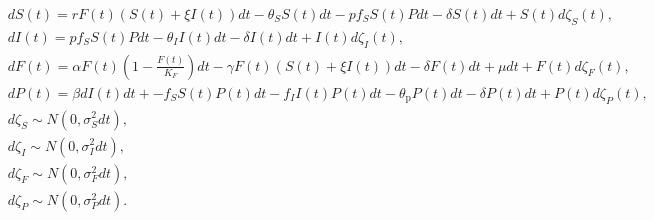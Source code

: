 \documentclass[12pt]{article}
\begin{document}
{
\small
\begin{align}
&d S(t) = r F(t)\left(S(t)+\xi I(t)\right)dt - \theta_{S}S(t) dt - p f_{S} S(t) Pdt - \delta S(t)dt + S(t) d\zeta_{S}(t),\\
&d I(t) = p f_{S} S(t) Pdt - \theta_{I} I(t)dt - \delta I(t)dt + I(t) d\zeta_{I}(t),\\
&dF(t) = \alpha F(t)\left(1-\frac{F(t)}{K_F}\right)dt - \gamma F(t) \left(S(t)+\xi I(t)\right) dt - \delta F(t) dt + \mu dt + F(t) d\zeta_F(t),\\
&d P(t) = \beta d I(t)dt +  - f_{S} S(t) P(t)dt - f_{I} I(t) P(t)dt - \theta_{\mathrm{p}} P(t)dt - \delta P(t) dt + P(t) d\zeta_{P}(t),\\
&d\zeta_{S} \sim N\left(0, \sigma_{S}^{2}dt\right),\\
&d\zeta_{I} \sim N\left(0, \sigma_{I}^{2}dt\right),\\
&d\zeta_{F} \sim N\left(0, \sigma_{F}^{2}dt\right),\\
&d\zeta_{P} \sim N\left(0, \sigma_{P}^{2}dt\right).
\end{align}
}
\end{document}
